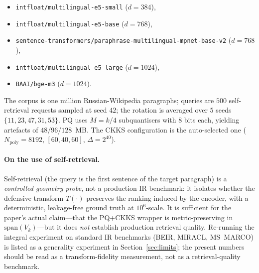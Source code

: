 \documentclass[11pt,a4paper]{article}
\begin{document}
\begin{itemize}[leftmargin=18pt,topsep=2pt,itemsep=2pt]
\item \texttt{intfloat/multilingual-e5-small} ($d = 384$),
\item \texttt{intfloat/multilingual-e5-base} ($d = 768$),
\item \texttt{sentence-transformers/paraphrase-multilingual-mpnet-base-v2} ($d = 768$),
\item \texttt{intfloat/multilingual-e5-large} ($d = 1024$),
\item \texttt{BAAI/bge-m3} ($d = 1024$).
\end{itemize}

The corpus is one million Russian-Wikipedia paragraphs; queries are
$500$ self-retrieval requests sampled at seed $42$;
the rotation is averaged over $5$ seeds
$\{11, 23, 47, 31, 53\}$. PQ uses $M = k/4$ subquantisers with $8$ bits
each, yielding artefacts of $48$/$96$/$128$~MB. The CKKS configuration
is the auto-selected one
($N_{\mathrm{poly}} = 8192$, $[60, 40, 60]$, $\Delta = 2^{40}$).

\paragraph{On the use of self-retrieval.} Self-retrieval (the query is
the first sentence of the target paragraph) is a \emph{controlled
geometry probe}, not a production IR benchmark: it isolates whether the
defensive transform $T(\cdot)$ preserves the ranking induced by the
encoder, with a deterministic, leakage-free ground truth at
$10^6$-scale. It is sufficient for the paper's actual claim---that the
PQ+CKKS wrapper is metric-preserving in $\mathrm{span}(V_k)$---but it
does \emph{not} establish production retrieval quality. Re-running the
integral experiment on standard IR benchmarks (BEIR, MIRACL, MS~MARCO)
is listed as a generality experiment in Section~\ref{sec:limits}; the
present numbers should be read as a transform-fidelity measurement,
not as a retrieval-quality benchmark.
\end{document}
